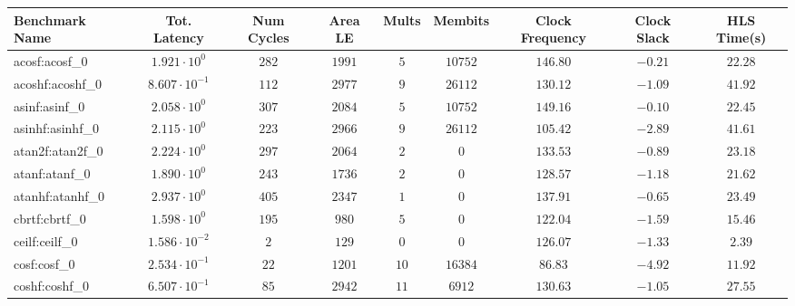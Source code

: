 \begin{tabular}{|l|c|c|c|c|c|c|c|c|}
\hline
Benchmark Name               & Tot. Latency            & Num Cycles & Area LE   & Mults   & Membits    & Clock Frequency & Clock Slack & HLS Time(s) \\
\hline
acosf:acosf\_0               & $ 1.921 \cdot 10^{0}  $ & $ 282    $ & $ 1991  $ & $ 5   $ & $ 10752  $ & $ 146.80      $ & $ -0.21   $ & $ 22.28   $ \\
acoshf:acoshf\_0             & $ 8.607 \cdot 10^{-1} $ & $ 112    $ & $ 2977  $ & $ 9   $ & $ 26112  $ & $ 130.12      $ & $ -1.09   $ & $ 41.92   $ \\
asinf:asinf\_0               & $ 2.058 \cdot 10^{0}  $ & $ 307    $ & $ 2084  $ & $ 5   $ & $ 10752  $ & $ 149.16      $ & $ -0.10   $ & $ 22.45   $ \\
asinhf:asinhf\_0             & $ 2.115 \cdot 10^{0}  $ & $ 223    $ & $ 2966  $ & $ 9   $ & $ 26112  $ & $ 105.42      $ & $ -2.89   $ & $ 41.61   $ \\
atan2f:atan2f\_0             & $ 2.224 \cdot 10^{0}  $ & $ 297    $ & $ 2064  $ & $ 2   $ & $ 0      $ & $ 133.53      $ & $ -0.89   $ & $ 23.18   $ \\
atanf:atanf\_0               & $ 1.890 \cdot 10^{0}  $ & $ 243    $ & $ 1736  $ & $ 2   $ & $ 0      $ & $ 128.57      $ & $ -1.18   $ & $ 21.62   $ \\
atanhf:atanhf\_0             & $ 2.937 \cdot 10^{0}  $ & $ 405    $ & $ 2347  $ & $ 1   $ & $ 0      $ & $ 137.91      $ & $ -0.65   $ & $ 23.49   $ \\
cbrtf:cbrtf\_0               & $ 1.598 \cdot 10^{0}  $ & $ 195    $ & $ 980   $ & $ 5   $ & $ 0      $ & $ 122.04      $ & $ -1.59   $ & $ 15.46   $ \\
ceilf:ceilf\_0               & $ 1.586 \cdot 10^{-2} $ & $ 2      $ & $ 129   $ & $ 0   $ & $ 0      $ & $ 126.07      $ & $ -1.33   $ & $ 2.39    $ \\
cosf:cosf\_0                 & $ 2.534 \cdot 10^{-1} $ & $ 22     $ & $ 1201  $ & $ 10  $ & $ 16384  $ & $ 86.83       $ & $ -4.92   $ & $ 11.92   $ \\
coshf:coshf\_0               & $ 6.507 \cdot 10^{-1} $ & $ 85     $ & $ 2942  $ & $ 11  $ & $ 6912   $ & $ 130.63      $ & $ -1.05   $ & $ 27.55   $ \\

\end{tabular}
